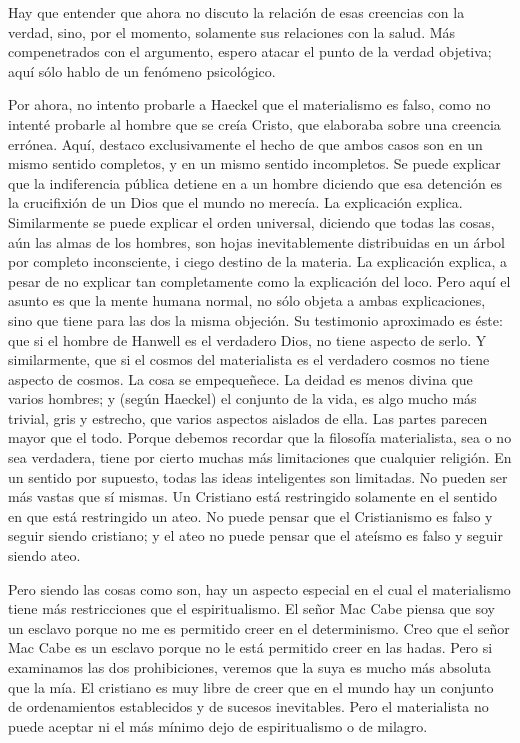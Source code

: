 Hay que entender que ahora no discuto la relación de esas creencias con la verdad, sino, por el
momento, solamente sus relaciones con la salud. Más compenetrados con el argumento, espero atacar el
punto de la verdad objetiva; aquí sólo hablo de un fenómeno psicológico.

Por ahora, no intento probarle a Haeckel que el materialismo es falso, como no intenté probarle al
hombre que se creía Cristo, que elaboraba sobre una creencia errónea. Aquí, destaco exclusivamente el
hecho de que ambos casos son en un mismo sentido completos, y en un mismo sentido incompletos. Se
puede explicar que la indiferencia pública detiene en  a un hombre diciendo que esa detención
es la crucifixión de un Dios que el mundo no merecía. La explicación explica. Similarmente se puede
explicar el orden universal, diciendo que todas las cosas, aún las almas de los hombres, son hojas
inevitablemente distribuidas en un árbol por completo inconsciente, i ciego destino de la materia. La
explicación explica, a pesar de no explicar tan completamente como la explicación del loco. Pero aquí el
asunto es que la mente humana normal, no sólo objeta a ambas explicaciones, sino que tiene para las dos
la misma objeción. Su testimonio aproximado es éste: que si el hombre de Hanwell es el verdadero Dios,
no tiene aspecto de serlo. Y similarmente, que si el cosmos del materialista es el verdadero cosmos no
tiene aspecto de cosmos. La cosa se empequeñece. La deidad es menos divina que varios hombres; y
(según Haeckel) el conjunto de la vida, es algo mucho más trivial, gris y estrecho, que varios aspectos
aislados de ella. Las partes parecen mayor que el todo. Porque debemos recordar que la filosofía
materialista, sea o no sea verdadera, tiene por cierto muchas más limitaciones que cualquier religión. En
un sentido por supuesto, todas las ideas inteligentes son limitadas. No pueden ser más vastas que sí
mismas. Un Cristiano está restringido solamente en el sentido en que está restringido un ateo. No puede
pensar que el Cristianismo es falso y seguir siendo cristiano; y el ateo no puede pensar que el ateísmo es
falso y seguir siendo ateo.

Pero siendo las cosas como son, hay un aspecto especial en el cual el materialismo tiene más
restricciones que el espiritualismo. El señor Mac Cabe piensa que soy un esclavo porque no me es
permitido creer en el determinismo. Creo que el señor Mac Cabe es un esclavo porque no le está
permitido creer en las hadas. Pero si examinamos las dos prohibiciones, veremos que la suya es mucho
más absoluta que la mía. El cristiano es muy libre de creer que en el mundo hay un conjunto de
ordenamientos establecidos y de sucesos inevitables. Pero el materialista no puede aceptar ni el más
mínimo dejo de espiritualismo o de milagro.

